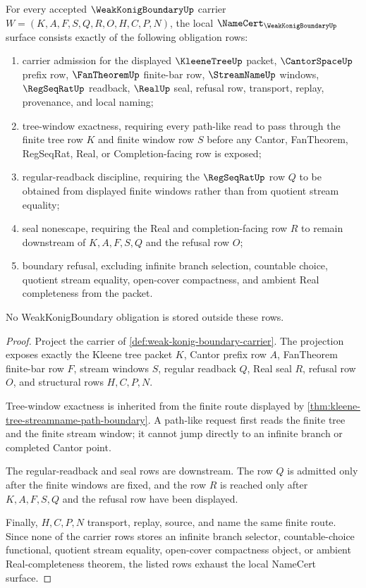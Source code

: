 \begin{theorem}
\label{thm:weak-konig-boundary-namecert-obligations}
For every accepted $\WeakKonigBoundaryUp$ carrier $W=(K,A,F,S,Q,R,O,H,C,P,N)$, the local $\NameCert_{\WeakKonigBoundaryUp}$ surface consists exactly of the following obligation rows:
\begin{enumerate}
\item carrier admission for the displayed $\KleeneTreeUp$ packet, $\CantorSpaceUp$ prefix row, $\FanTheoremUp$ finite-bar row, $\StreamNameUp$ windows, $\RegSeqRatUp$ readback, $\RealUp$ seal, refusal row, transport, replay, provenance, and local naming;
\item tree-window exactness, requiring every path-like read to pass through the finite tree row $K$ and finite window row $S$ before any Cantor, FanTheorem, RegSeqRat, Real, or Completion-facing row is exposed;
\item regular-readback discipline, requiring the $\RegSeqRatUp$ row $Q$ to be obtained from displayed finite windows rather than from quotient stream equality;
\item seal nonescape, requiring the Real and completion-facing row $R$ to remain downstream of $K,A,F,S,Q$ and the refusal row $O$;
\item boundary refusal, excluding infinite branch selection, countable choice, quotient stream equality, open-cover compactness, and ambient Real completeness from the packet.
\end{enumerate}
No WeakKonigBoundary obligation is stored outside these rows.
\end{theorem}
\begin{proof}
Project the carrier of \autoref{def:weak-konig-boundary-carrier}. The projection exposes exactly the Kleene tree packet $K$, Cantor prefix row $A$, FanTheorem finite-bar row $F$, stream windows $S$, regular readback $Q$, Real seal $R$, refusal row $O$, and structural rows $H,C,P,N$.

Tree-window exactness is inherited from the finite route displayed by \autoref{thm:kleene-tree-streamname-path-boundary}. A path-like request first reads the finite tree and the finite stream window; it cannot jump directly to an infinite branch or completed Cantor point.

The regular-readback and seal rows are downstream. The row $Q$ is admitted only after the finite windows are fixed, and the row $R$ is reached only after $K,A,F,S,Q$ and the refusal row have been displayed.

Finally, $H,C,P,N$ transport, replay, source, and name the same finite route. Since none of the carrier rows stores an infinite branch selector, countable-choice functional, quotient stream equality, open-cover compactness object, or ambient Real-completeness theorem, the listed rows exhaust the local NameCert surface.
\end{proof}

